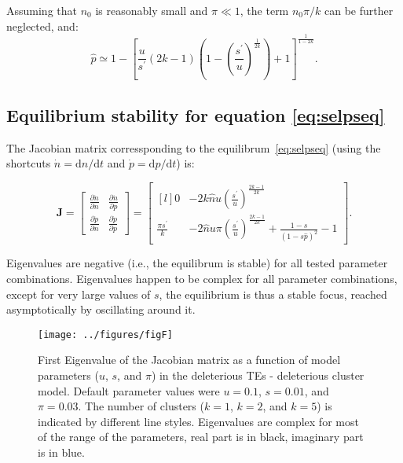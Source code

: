 \documentclass[10pt,a4paper]{article}
\begin{document}
\begin{appendices}
Assuming that $n_0$ is reasonably small and $\pi \ll 1$, the term $n_0 \pi / k$ can be further neglected, and:
\begin{equation*}
		\hat p \simeq 1-\left[\frac{u}{s^\prime}(2k-1)(1-\left(\frac{s^\prime}{u}\right)^\frac{1}{2k})+1\right]^\frac{1}{1-2k}.
\end{equation*}

\subsection{\label{app:selpseq} Equilibrium stability for equation \ref{eq:selpseq}}

The Jacobian matrix corressponding to the equilibrum~\ref{eq:selpseq} (using the shortcuts $\dot n = \mathrm d n / \mathrm d t $ and  $\dot p = \mathrm d p / \mathrm d t$) is:

\begin{equation*}
\bm J = 
   \begin{bmatrix}  \frac{\partial \dot n}{\partial n} &  \frac{\partial \dot n}{\partial p} \\[1em]
					\frac{\partial \dot p}{\partial n} &  \frac{\partial \dot p}{\partial p} \end{bmatrix} =
   \begin{bmatrix*}[l]
				0 & -2 k \hat n u \left( \frac{s^\prime}{u}\right) ^\frac{2k-1}{2k} \\[1em]
				\frac{\pi s^\prime}{k} & -2 \hat n u \pi \left( \frac{s^\prime}{u}\right) ^\frac{2k-1}{2k} + \frac{1-s}{(1-s \hat p)^2} - 1
	\end{bmatrix*}.
\end{equation*}

Eigenvalues are negative (i.e., the equilibrum is stable) for all tested parameter combinations. Eigenvalues happen to be complex for all parameter combinations, except for very large values of $s$, the equilibrium is thus a stable focus, reached asymptotically by oscillating around it. 

\begin{figure}
\begin{adjustwidth}{-2in}{0in}
\begin{flushright}
	\texttt{[image: ../figures/figF]}
	\caption{\label{fig:figF}  First Eigenvalue of the Jacobian matrix as a function of model parameters ($u$, $s$, and $\pi$) in the deleterious TEs - deleterious cluster model. Default parameter values were $u=0.1$, $s=0.01$, and $\pi=0.03$. The number of clusters ($k=1$, $k=2$, and $k=5$) is indicated by different line styles. Eigenvalues are complex for most of the range of the parameters, real part is in black, imaginary part is in blue. }
\end{flushright}\end{adjustwidth}
\end{figure}

\end{appendices}
\end{document}
